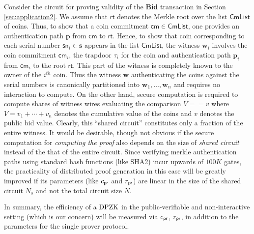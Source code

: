 Consider the circuit for proving validity of the {\bf Bid} transaction in Section \ref{sec:application2}. We assume that $\mathsf{rt}$ denotes the Merkle
 root over the list $\mathsf{CmList}$ of coins. Thus, to show that a coin commitment $\mathsf{cm}\in \mathsf{CmList}$, one provides an authentication path 
 $\bm{p}$ from $\mathsf{cm}$ to $\mathsf{rt}$. Hence, to show that coin corresponding to each serial number
$\mathsf{sn}_i\in \bm{s}$ appears in the list $\mathsf{CmList}$, the witness $\bm{w}_i$ involves the coin commitment $\mathsf{cm}_i$, the trapdoor $\tau_i$ for the coin 
and authentication path $\bm{p}_i$ from $\mathsf{cm}_i$ to the root $\mathsf{rt}$. This part of the witness is completely known to the owner of 
the $i^{th}$ coin. Thus the witness $\bm{w}$ authenticating the coins against the serial numbers is canonically partitioned into $\bm{w}_1,\ldots,\bm{w}_n$
and requires no interaction to compute. On the other hand, secure computation is required to compute shares of witness wires evaluating the comparison
$V==v$ where $V=v_1+\cdots+v_n$ denotes the cumulative value of the coins and $v$ denotes the public bid value. Clearly, this ``shared circuit'' 
constitutes only a fraction of the entire witness. It would be desirable, though not obvious if the secure computation for {\em computing the proof} 
also depends on the size of {\em shared circuit} instead of the that of the entire circuit. Since verifying merkle authentication paths using 
standard hash functions (like SHA2) incur upwards of $100K$ gates, the practicality of distributed proof generation in this case will be
greatly improved if its parameters (like $c_\mathsf{pr}$ and $r_\mathsf{pr}$) are 
linear in the size of the shared circuit $N_s$ and not the total circuit size $N$.


In summary, the efficiency of a $\text{DPZK}$ in the public-verifiable and
non-interactive setting (which is our concern) will be measured via $c_\mathsf{pr}$,
$r_\mathsf{pr}$, in addition to the parameters for the single prover protocol.

